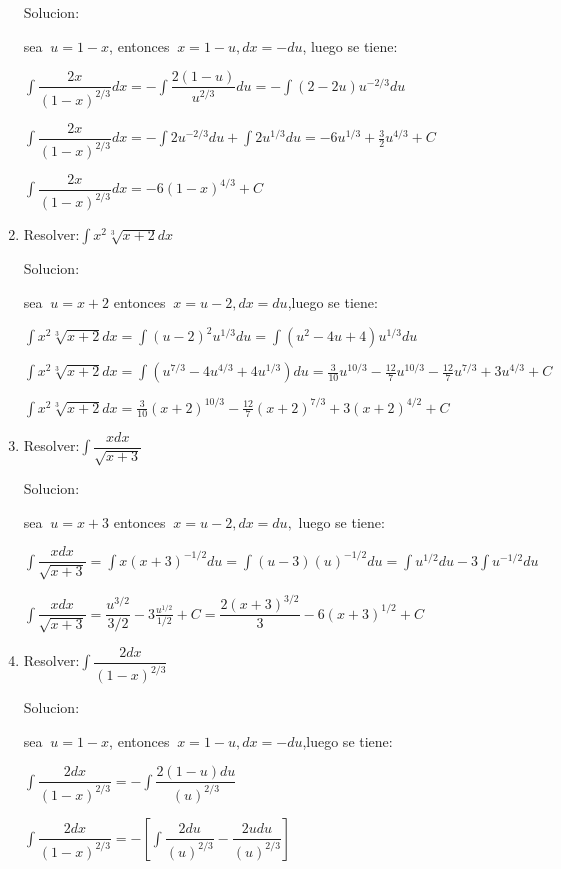 \documentclass[10pt,a4paper]{book}
\newcommand{\ds}{\displaystyle}
\begin{document}
\begin{enumerate}
        Solucion:

        sea $\ds\ u=1-x$, entonces $\ds\ x=1-u, dx=-du$, luego se tiene:

        $\ds\int\dfrac{2x}{(1-x)^{2/3}}dx=-\int\dfrac{2(1-u)}{u^{2/3}}du=-\int(2-2u)u^{-2/3}du$

        $\ds\int\dfrac{2x}{(1-x)^{2/3}}dx=-\int 2u^{-2/3}du+\int 2u^{1/3}du=-6u^{1/3}+\frac{3}{2}u^{4/3}+C$

        $\ds\int\dfrac{2x}{(1-x)^{2/3}}dx=-6(1-x)^{4/3}+C$

    \vspace{0.5cm}
    \item Resolver:$\ds\int x^2\sqrt[3]{x+2}dx$
    
        Solucion:

        sea $\ds\ u=x+2$ entonces $\ds\ x=u-2,dx=du$,luego se tiene:

        $\ds\int x^2\sqrt[3]{x+2}dx=\int(u-2)^2u^{1/3}du=\int(u^2-4u+4)u^{1/3}du$

        $\ds\int x^2\sqrt[3]{x+2}dx=\int\left(u^{7/3}-4u^{4/3}+4u^{1/3}\right)du=\frac{3}{10}u^{10/3}-\frac{12}{7}u^{10/3}
        -\frac{12}{7}u^{7/3}+3u^{4/3}+C$

        $\ds\int x^2\sqrt[3]{x+2}dx=\frac{3}{10}(x+2)^{10/3}-\frac{12}{7}(x+2)^{7/3}+3(x+2)^{4/2}+C$

    \vspace{0.5cm}
    \item Resolver:$\ds\int \dfrac{xdx}{\sqrt{x+3} }$
    
        Solucion:

        sea $\ds\ u=x+3$ entonces $\ds\ x=u-2,dx=du,$ luego se tiene:

        $\ds\int \dfrac{xdx}{\sqrt{x+3}}=\int x(x+3)^{-1/2}du=\int(u-3)(u)^{-1/2}du=\int u^{1/2}du-3\int u^{-1/2}du$

        $\ds\int \dfrac{xdx}{\sqrt{x+3}}=\dfrac{u^{3/2}}{3/2}-3\frac{u^{1/2}}{1/2}+C=\dfrac{2(x+3)^{3/2}}{3}-6(x+3)^{1/2}+C$

    \vspace{0.5cm}
    \item Resolver:$\ds\int \dfrac{2dx}{(1-x)^{2/3}}$
    
        Solucion:
        
        sea $\ds\ u=1-x$, entonces $\ds\ x=1-u,dx=-du$,luego se tiene:

        $\ds\int \dfrac{2dx}{(1-x)^{2/3}}=-\int\dfrac{2(1-u)du}{(u)^{2/3}}$

        $\ds\int \dfrac{2dx}{(1-x)^{2/3}}=-\left[\int\dfrac{2du}{(u)^{2/3}}-\dfrac{2udu}{(u)^{2/3}}\right]$


\end{enumerate}
\end{document}
